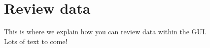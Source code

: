 
\chapter{Review data}
\minitoc

This is where we explain how you can review data within the GUI. \\
Lots of text to come!